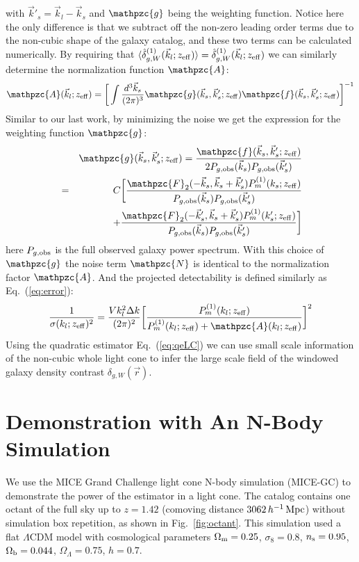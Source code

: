 \documentclass[prd,amsmath,amssymb,floatfix,superscriptaddress,nofootinbib,twocolumn]{revtex4-1}
\newcommand{\vrr}{\vec{r}}
\newcommand{\vs}{\nonumber\\}
\newcommand{\ec}[1]{Eq.~(\ref{eq:#1})}
\newcommand{\eql}[1]{\label{eq:#1}}
\newcommand{\rf}[1]{\ref{fig:#1}}
\begin{document}
with $\vec{k}'_s = \vec{k}_l-\vec{k}_s$ and $\mathpzc{g}$ being the weighting function. Notice here the only difference is that we subtract off the non-zero leading order terms due to the non-cubic shape of the galaxy catalog, and these two terms can be calculated numerically. By requiring that $\langle \hat{\delta}^{(1)}_{g,W}(\vec{k}_l;z_{\rm eff})\rangle = \hat{\delta}^{(1)}_{g,W}(\vec{k}_l;z_{\rm eff})$ we can similarly determine the normalization function $\mathpzc{A}$:
\begin{eqnarray}
\mathpzc{A}(\vec{k}_l;z_{\rm eff})=\bigg[ \int \frac{d^{3}\vec{k}_s}{(2\pi)^3}\mathpzc{g}(\vec{k}_s,\vec{k}'_s;z_{\rm eff})\mathpzc{f}(\vec{k}_s,\vec{k}'_s;z_{\rm eff}) \bigg]^{-1}
\end{eqnarray}
Similar to our last work, by minimizing the noise we get the expression for the weighting function $\mathpzc{g}$:
\begin{eqnarray}
&&\mathpzc{g}(\vec{k}_s,\vec{k}'_s;z_{\rm eff})=\frac{\mathpzc{f}(\vec{k}_s,\vec{k}'_s;z_{\rm eff})}{2P_{g,\rm obs}(\vec{k}_s)P_{g,\rm obs}(\vec{k}'_s)}\vs
&=&C\bigg[\frac{\mathpzc{F}_2(-\vec{k}_s,\vec{k}_s+\vec{k}'_s)P_{m}^{(1)}(k_s;z_{\rm eff})}{P_{g,\rm obs}(\vec{k}_s)P_{g,\rm obs}(\vec{k}'_s)}\vs
&&\, +\frac{\mathpzc{F}_2(-\vec{k}'_s,\vec{k}_s+\vec{k}'_s)P_{m}^{(1)}(k'_s;z_{\rm eff})}{P_{g,\rm obs}(\vec{k}_s)P_{g,\rm obs}(\vec{k}'_s)}\bigg]
\end{eqnarray}
here $P_{g,\rm obs}$ is the full observed galaxy power spectrum. With this choice of $\mathpzc{g}$ the noise term $\mathpzc{N}$ is identical to the normalization factor $\mathpzc{A}$. And the projected detectability is defined similarly as \ec{error}:
\begin{eqnarray}
\frac{1}{\sigma(k_l;z_{\rm eff})^2}=\frac{Vk_l^2\Delta k}{(2\pi)^2}\bigg[\frac{P_{m}^{(1)}(k_l;z_{\rm eff})}{P_{m}^{(1)}(k_l;z_{\rm eff})+\mathpzc{A}(k_l;z_{\rm eff}) }\bigg]^2 \eql{errorLC}
\end{eqnarray}
Using the quadratic estimator \ec{qeLC} we can use small scale information of the non-cubic whole light cone to infer the large scale field of the windowed galaxy density contrast $\delta_{g,W}(\vrr)$.

\section{Demonstration with An N-Body Simulation} \label{sec4}
\noindent We use the MICE Grand Challenge light cone N-body simulation (MICE-GC) \cite{Fosalba:2015MI}\cite{Fosalba:2015MII}\cite{Fosalba:2013mra} to demonstrate the power of the estimator in a light cone. The catalog contains one octant of the full sky up to $z = 1.42$ (comoving distance $3062\, h^{-1}\, \rm Mpc$) without simulation box repetition, as shown in Fig.~\rf{octant}. This simulation used a flat $\Lambda$CDM model with cosmological parameters $ \Omega_{\rm m}=0.25$, $\sigma_8 = 0.8$, $n_{\rm s}=0.95$, $\Omega_{\rm b}=0.044$, $\Omega_{\Lambda}=0.75$, $h=0.7$. 
\end{document}

